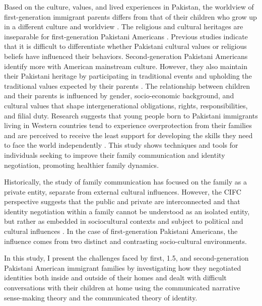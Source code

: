 Based on the culture, values, and lived experiences in Pakistan, the worldview of first-generation immigrant parents differs from that of their children who grow up in a different culture and worldview \citep{anjumRELATIONSHIPPARENTINGSTYLES2019, chanEarlyLookParental2020, khalequeDifferentialAcculturationPakistani2015}. The religious and cultural heritages are inseparable for first-generation Pakistani Americans \citep{bashirUnderstandingContributingFactors2018}. Previous studies indicate that it is difficult to differentiate whether Pakistani cultural values or religious beliefs have influenced their behaviors. Second-generation Pakistani Americans identify more with American mainstream culture. However, they also maintain their Pakistani heritage by participating in traditional events and upholding the traditional values expected by their parents \citep{bashirUnderstandingContributingFactors2018}. The relationship between children and their parents is influenced by gender, socio-economic background, and cultural values that shape intergenerational obligations, rights, responsibilities, and filial duty. Research suggests that young people born to Pakistani immigrants living in Western countries tend to experience overprotection from their families and are perceived to receive the least support for developing the skills they need to face the world independently \citep{chattooYoungPeoplePakistani2004, rasoolBangladeshiIndianPakistani2020}. This study shows techniques and tools for individuals seeking to improve their family communication and identity negotiation, promoting healthier family dynamics.

Historically, the study of family communication has focused on the family as a private entity, separate from external cultural influences. However, the CIFC perspective suggests that the public and private are interconnected and that identity negotiation within a family cannot be understood as an isolated entity, but rather as embedded in sociocultural contexts and subject to political and cultural influences \citep{suterIntroductionCriticalApproaches2016}. In the case of first-generation Pakistani Americans, the influence comes from two distinct and contrasting socio-cultural environments.

In this study, I present the challenges faced by first, 1.5, and second-generation Pakistani American immigrant families by investigating how they negotiated identities both inside and outside of their homes and dealt with difficult conversations with their children at home using the communicated narrative sense-making theory and the communicated theory of identity.

